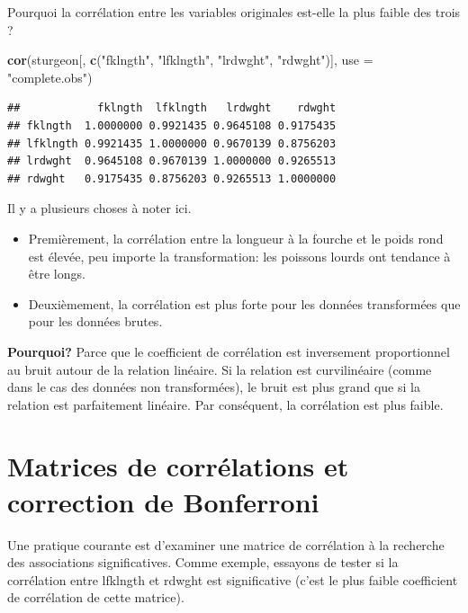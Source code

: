 \documentclass[
  12pt,
]{book}
\newenvironment{Shaded}{\begin{snugshade}}{\end{snugshade}}
\newcommand{\DataTypeTok}[1]{\textcolor[rgb]{0.13,0.29,0.53}{#1}}
\newcommand{\KeywordTok}[1]{\textcolor[rgb]{0.13,0.29,0.53}{\textbf{#1}}}
\newcommand{\NormalTok}[1]{#1}
\newcommand{\StringTok}[1]{\textcolor[rgb]{0.31,0.60,0.02}{#1}}
\providecommand{\tightlist}{%
  \setlength{\itemsep}{0pt}\setlength{\parskip}{0pt}}
\begin{document}
Pourquoi la corrélation entre les variables originales est-elle la plus faible des trois ?

\begin{Shaded}
\begin{Highlighting}[]
\KeywordTok{cor}\NormalTok{(sturgeon[, }\KeywordTok{c}\NormalTok{(}\StringTok{"fklngth"}\NormalTok{, }\StringTok{"lfklngth"}\NormalTok{, }\StringTok{"lrdwght"}\NormalTok{, }\StringTok{"rdwght"}\NormalTok{)], }\DataTypeTok{use =} \StringTok{"complete.obs"}\NormalTok{)}
\end{Highlighting}
\end{Shaded}

\begin{verbatim}
##            fklngth  lfklngth   lrdwght    rdwght
## fklngth  1.0000000 0.9921435 0.9645108 0.9175435
## lfklngth 0.9921435 1.0000000 0.9670139 0.8756203
## lrdwght  0.9645108 0.9670139 1.0000000 0.9265513
## rdwght   0.9175435 0.8756203 0.9265513 1.0000000
\end{verbatim}

Il y a plusieurs choses à noter ici.

\begin{itemize}
\tightlist
\item
  Premièrement, la corrélation entre la longueur à la fourche et le poids rond est élevée, peu importe la transformation: les poissons lourds ont tendance à être longs.
\item
  Deuxièmement, la corrélation est plus forte pour les données
  transformées que pour les données brutes.
\end{itemize}

\textbf{Pourquoi?} Parce que le coefficient de corrélation est inversement proportionnel au bruit autour de la relation linéaire.
Si la relation est curvilinéaire (comme dans le cas des données non transformées), le bruit est plus grand que si la relation est parfaitement linéaire.
Par conséquent, la corrélation est plus faible.

\hypertarget{matrices-de-corruxe9lations-et-correction-de-bonferroni}{%
\section{Matrices de corrélations et correction de Bonferroni}\label{matrices-de-corruxe9lations-et-correction-de-bonferroni}}

Une pratique courante est d'examiner une matrice de corrélation à la recherche des associations significatives.
Comme exemple, essayons de tester si la corrélation entre lfklngth et rdwght est significative (c'est le plus faible coefficient de corrélation de cette matrice).
\end{document}
